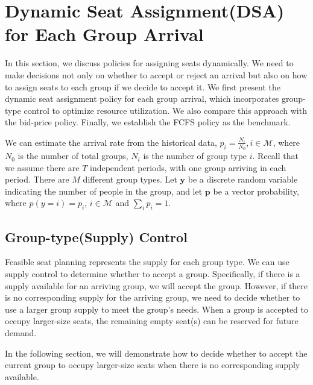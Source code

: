 
\section{Dynamic Seat Assignment(DSA) for Each Group Arrival}
In this section, we discuss policies for assigning seats dynamically. We need to make decisions not only on whether to accept or reject an arrival but also on how to assign seats to each group if we decide to accept it. We first present the dynamic seat assignment policy for each group arrival, which incorporates group-type control to optimize resource utilization. We also compare this approach with the bid-price policy. Finally, we establish the FCFS policy as the benchmark.

We can estimate the arrival rate from the historical data, $p_i = \frac{N_{i}}{N_{0}}, i \in \mathcal{M}$, where $N_{0}$ is the number of total groups, $N_{i}$ is the number of group type $i$. Recall that we assume there are $T$ independent periods, with one group arriving in each period. There are $M$ different group types. Let $\mathbf{y}$ be a discrete random variable indicating the number of people in the group, and let $\mathbf{p}$ be a vector probability, where $p(y = i) = p_i$, $i \in \mathcal{M}$ and $\sum_{i} p_{i} =1$.


\subsection{Group-type(Supply) Control}\label{nested_policy}
Feasible seat planning represents the supply for each group type. We can use supply control to determine whether to accept a group. Specifically, if there is a supply available for an arriving group, we will accept the group. However, if there is no corresponding supply for the arriving group, we need to decide whether to use a larger group supply to meet the group's needs. When a group is accepted to occupy larger-size seats, the remaining empty seat(s) can be reserved for future demand.

In the following section, we will demonstrate how to decide whether to accept the current group to occupy larger-size seats when there is no corresponding supply available.

